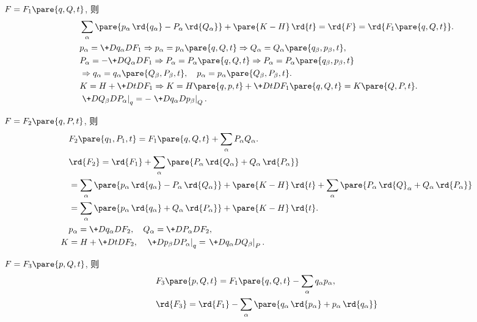 \documentclass[../LectureNotes.tex]{subfiles}
\begin{document}
\begin{cenum}
    \item $F = F_1\pare{q,Q,t}$, 则
    \begin{align*}
        & \sum_{\alpha} \pare{p_\alpha\,\rd{q_\alpha} - P_\alpha \,\rd{Q_\alpha}} + \pare{K-H}\,\rd{t} = \rd{F} = \rd{F_1\pare{q,Q,t}}. \\
        & p_\alpha = \+D{q_\alpha}D{F_1} \Rightarrow p_\alpha = p_\alpha\pare{q,Q,t} \Rightarrow Q_\alpha = Q_\alpha\pare{q_\beta,p_\beta,t}, \\
        & P_\alpha = -\+D{Q_\alpha}D{F_1} \Rightarrow P_\alpha = P_\alpha\pare{q,Q,t} \Rightarrow P_\alpha = P_\alpha\pare{q_\beta,p_\beta,t} \\
        &\Rightarrow q_\alpha = q_\alpha\pare{Q_\beta,P_\beta,t},\quad p_\alpha = p_\alpha\pare{Q_\beta,P_\beta,t}. \\
        & K = H + \+DtD{F_1} \Rightarrow K = H\pare{q,p,t} + \+DtD{F_1\pare{q,Q,t}} = K\pare{Q,P,t}. \\
        & \left.\+D{Q_\beta}D{P_\alpha}\right\vert_q = -\left.\+D{q_\alpha}D{p_\beta}\right\vert_Q.
    \end{align*}
    \item $F=F_2\pare{q,P,t}$, 则
    \begin{align*}
        & F_2\pare{q_1,P_1,t} = F_1\pare{q,Q,t} + \sum_\alpha P_\alpha Q_\alpha. \\
        & \rd{F_2} = \rd{F_1} + \sum_\alpha \pare{P_\alpha\,\rd{Q_\alpha} + Q_\alpha\,\rd{P_\alpha}} \\
        &= \sum_\alpha\pare{p_\alpha\,\rd{q_\alpha} - P_\alpha\,\rd{Q_\alpha}} + \pare{K-H}\,\rd{t} + \sum_\alpha\pare{P_\alpha\,\rd{Q}_\alpha + Q_\alpha\,\rd{P_\alpha}} \\
        &= \sum_\alpha \pare{p_\alpha\,\rd{q_\alpha} + Q_\alpha\,\rd{P_\alpha}} + \pare{K-H}\,\rd{t}. \\
        & p_\alpha = \+D{q_\alpha}D{F_2}, \quad Q_\alpha = \+D{P_\alpha}D{F_2}, \\
        K &= H + \+DtD{F_2},\quad \left.\+D{p_\beta}D{P_\alpha}\right\vert_q = \left.\+D{q_\alpha}D{Q_\beta}\right\vert_P.
    \end{align*}
    \item $F=F_3\pare{p,Q,t}$, 则
    \begin{align*}
        & F_3\pare{p,Q,t} = F_1\pare{q,Q,t} - \sum_\alpha q_\alpha p_\alpha, \\
        & \rd{F_3} = \rd{F_1} - \sum_\alpha\pare{q_\alpha\,\rd{p_\alpha} + p_\alpha\,\rd{q_\alpha}} \\

\end{align*}
\end{cenum}
\end{document}
